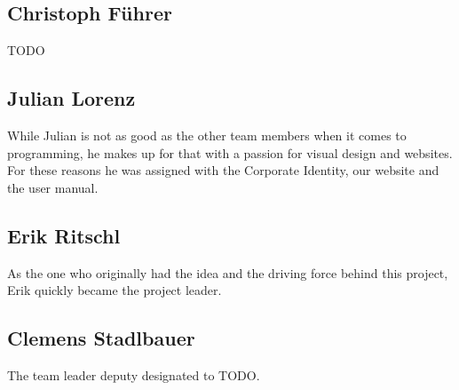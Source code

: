 \subsection{Christoph Führer}

TODO

\subsection{Julian Lorenz}

While Julian is not as good as the other team members when it comes to
programming, he makes up for that with a passion for visual design and
websites. For these reasons he was assigned with the Corporate Identity, our
website and the user manual.

\subsection{Erik Ritschl}

As the one who originally had the idea and the driving force behind this
project, Erik quickly became the project leader.

\subsection{Clemens Stadlbauer}
The team leader deputy designated to TODO.
